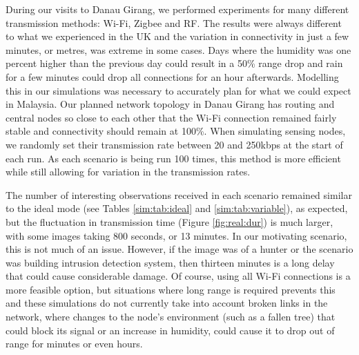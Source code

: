 During our visits to Danau Girang, we performed experiments for many different transmission methods: Wi-Fi, Zigbee and RF. The results were always different to what we experienced in the UK and the variation in connectivity in just a few minutes, or metres, was extreme in some cases. Days where the humidity was one percent higher than the previous day could result in a 50\% range drop and rain for a few minutes could drop all connections for an hour afterwards. Modelling this in our simulations was necessary to accurately plan for what we could expect in Malaysia. Our planned network topology in Danau Girang has routing and central nodes so close to each other that the Wi-Fi connection remained fairly stable and connectivity should remain at 100\%. When simulating sensing nodes, we randomly set their transmission rate between 20 and 250kbps at the start of each run. As each scenario is being run 100 times, this method is more efficient while still allowing for variation in the transmission rates. 

The number of interesting observations received in each scenario remained similar to the ideal mode (see Tables \ref{sim:tab:ideal} and \ref{sim:tab:variable}), as expected, but the fluctuation in transmission time (Figure \ref{fig:real:dur}) is much larger, with some images taking 800 seconds, or 13 minutes. In our motivating scenario, this is not much of an issue. However, if the image was of a hunter or the scenario was building intrusion detection system, then thirteen minutes is a long delay that could cause considerable damage. Of course, using all Wi-Fi connections is a more feasible option, but situations where long range is required prevents this and these simulations do not currently take into account broken links in the network, where changes to the node's environment (such as a fallen tree) that could block its signal or an increase in humidity, could cause it to drop out of range for minutes or even hours. 



